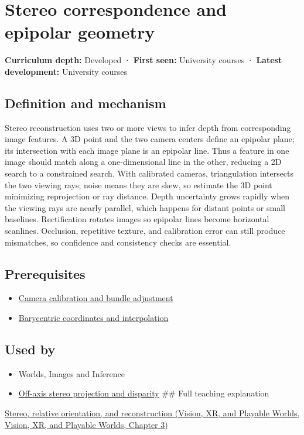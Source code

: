\hypertarget{appendix-c4e98b6e4001}{}\label{referencestart:appendix-c4e98b6e4001}
\section{Stereo correspondence and epipolar geometry}\label{appendix-c4e98b6e4001-stereo-correspondence-and-epipolar-geometry}

\textbf{Curriculum depth:} Developed · \textbf{First seen:} University courses · \textbf{Latest development:} University courses

\subsection{Definition and mechanism}\label{appendix-c4e98b6e4001-definition-and-mechanism}

Stereo reconstruction uses two or more views to infer depth from corresponding image features. A 3D point and the two camera centers define an epipolar plane; its intersection with each image plane is an epipolar line. Thus a feature in one image should match along a one-dimensional line in the other, reducing a 2D search to a constrained search. With calibrated cameras, triangulation intersects the two viewing rays; noise means they are skew, so estimate the 3D point minimizing reprojection or ray distance. Depth uncertainty grows rapidly when the viewing rays are nearly parallel, which happens for distant points or small baselines. Rectification rotates images so epipolar lines become horizontal scanlines. Occlusion, repetitive texture, and calibration error can still produce mismatches, so confidence and consistency checks are essential.

\subsection{Prerequisites}\label{appendix-c4e98b6e4001-prerequisites}

\begin{itemize}
\tightlist
\item
  \hyperref[appendix-3ee9861904d5]{Camera calibration and bundle adjustment}
\item
  \hyperref[appendix-02b9d9a81dca]{Barycentric coordinates and interpolation}
\end{itemize}

\subsection{Used by}\label{appendix-c4e98b6e4001-used-by}

\begin{itemize}
\item
  {Worlds, Images and Inference}
\item
  \hyperref[appendix-0976e86e5b9f]{Off-axis stereo projection and disparity} \#\# Full teaching explanation
\end{itemize}

\href{../07-Vision-XR-and-Playable-Worlds/main.pdf\#nameddest=04-visual-computing-ii-ch032-stereo-relative-orientation-and-reconstruction}{Stereo, relative orientation, and reconstruction (Vision, XR, and Playable Worlds, Vision, XR, and Playable Worlds, Chapter 3)}
